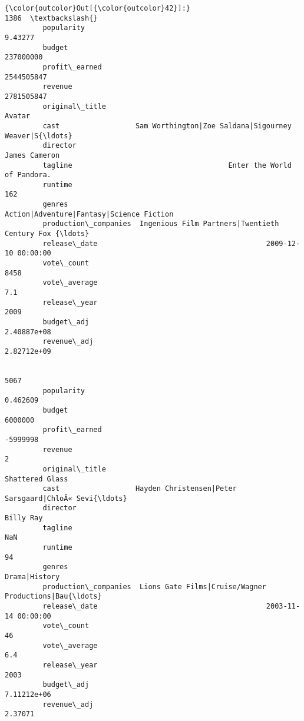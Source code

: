 \documentclass[11pt]{article}
\begin{document}
\begin{Verbatim}[commandchars=\\\{\}]
{\color{outcolor}Out[{\color{outcolor}42}]:}                                                                    1386  \textbackslash{}
         popularity                                                      9.43277   
         budget                                                        237000000   
         profit\_earned                                                2544505847   
         revenue                                                      2781505847   
         original\_title                                                   Avatar   
         cast                  Sam Worthington|Zoe Saldana|Sigourney Weaver|S{\ldots}   
         director                                                  James Cameron   
         tagline                                     Enter the World of Pandora.   
         runtime                                                             162   
         genres                         Action|Adventure|Fantasy|Science Fiction   
         production\_companies  Ingenious Film Partners|Twentieth Century Fox {\ldots}   
         release\_date                                        2009-12-10 00:00:00   
         vote\_count                                                         8458   
         vote\_average                                                        7.1   
         release\_year                                                       2009   
         budget\_adj                                                  2.40887e+08   
         revenue\_adj                                                 2.82712e+09   
         
                                                                            5067  
         popularity                                                     0.462609  
         budget                                                          6000000  
         profit\_earned                                                  -5999998  
         revenue                                                               2  
         original\_title                                          Shattered Glass  
         cast                  Hayden Christensen|Peter Sarsgaard|ChloÃ« Sevi{\ldots}  
         director                                                      Billy Ray  
         tagline                                                             NaN  
         runtime                                                              94  
         genres                                                    Drama|History  
         production\_companies  Lions Gate Films|Cruise/Wagner Productions|Bau{\ldots}  
         release\_date                                        2003-11-14 00:00:00  
         vote\_count                                                           46  
         vote\_average                                                        6.4  
         release\_year                                                       2003  
         budget\_adj                                                  7.11212e+06  
         revenue\_adj                                                     2.37071  
\end{Verbatim}
            
\end{document}

